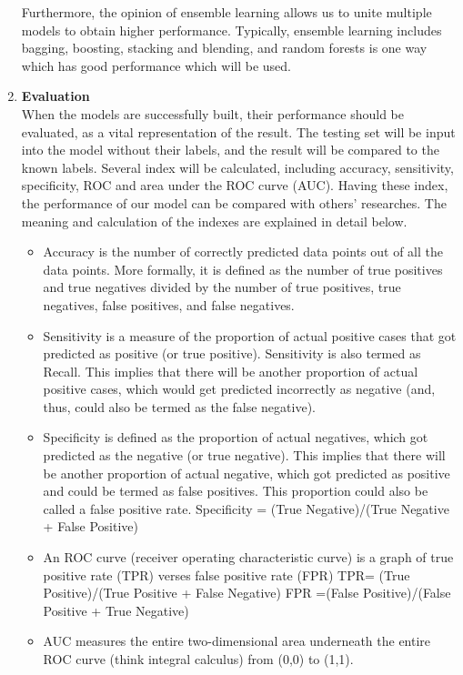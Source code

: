 \documentclass[ a4paper, 12pt, oneside ]{article} %
\begin{document}
\begin{enumerate}
Furthermore, the opinion of ensemble learning allows us to unite multiple models to obtain higher performance. Typically, ensemble learning includes bagging, boosting, stacking and blending, and random forests is one way which has good performance which will be used.\\
\item \textbf{Evaluation}\\
When the models are successfully built, their performance should be evaluated, as a vital representation of the result. The testing set will be input into the model without their labels, and the result will be compared to the known labels. Several index will be calculated, including accuracy, sensitivity, specificity, ROC and area under the ROC curve (AUC). Having these index, the performance of our model can be compared with others' researches. The meaning and calculation of the indexes are explained in detail below.
\begin{itemize}
\item Accuracy is the number of correctly predicted data points out of all the data points. More formally, it is defined as the number of true positives and true negatives divided by the number of true positives, true negatives, false positives, and false negatives. \\
\item Sensitivity is a measure of the proportion of actual positive cases that got predicted as positive (or true positive). Sensitivity is also termed as Recall. This implies that there will be another proportion of actual positive cases, which would get predicted incorrectly as negative (and, thus, could also be termed as the false negative).\\
\item Specificity is defined as the proportion of actual negatives, which got predicted as the negative (or true negative). This implies that there will be another proportion of actual negative, which got predicted as positive and could be termed as false positives. This proportion could also be called a false positive rate. Specificity = (True Negative)/(True Negative + False Positive)\\
\item An ROC curve (receiver operating characteristic curve) is a graph of true positive rate (TPR) verses false positive rate (FPR) TPR= (True Positive)/(True Positive + False Negative) FPR =(False Positive)/(False Positive + True Negative)\\
\item AUC measures the entire two-dimensional area underneath the entire ROC curve (think integral calculus) from (0,0) to (1,1).\\


\end{itemize}
\end{enumerate}
\end{document}
